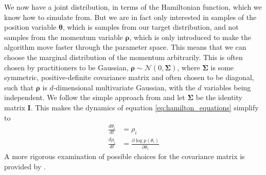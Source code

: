 We now have a joint distribution, in terms of the Hamiltonian function, which we know how to simulate from. But we are in fact only interested in samples of the position variable $\boldsymbol{\theta}$, which is samples from our target distribution, and not samples from the momentum variable $\boldsymbol{\rho}$, which is only introduced to make the algorithm move faster through the parameter space. This means that we can choose the marginal distribution of the momentum arbitrarily. This is often chosen by practitioners to be Gaussian, $\boldsymbol{\rho}\sim \mathcal{N}\left(0, \boldsymbol{\Sigma} \right)$, where $\boldsymbol{\Sigma}$ is some symmetric, positive-definite covariance matrix and often chosen to be diagonal, such that $\boldsymbol{\rho}$ is $d$-dimensional multivariate Gaussian, with the $d$ variables being independent. We follow the simple approach from \cite{hoffman2011nouturn} and let $\boldsymbol{\Sigma}$ be the identity matrix $\boldsymbol{I}$. This makes the dynamics of equation \ref{eq:hamilton_equations} simplify to 
\begin{equation*}
\begin{split}
\frac{d \theta_{i}}{d t}&=\rho_i \\
\frac{d \rho_{i}}{d t}&=\frac{\partial \log p(\theta_{i})}{\partial \theta_i} 
\end{split}
\end{equation*}
A more rigorous examination of possible choices for the covariance matrix is provided by \cite{neal2012mcmc}. 



